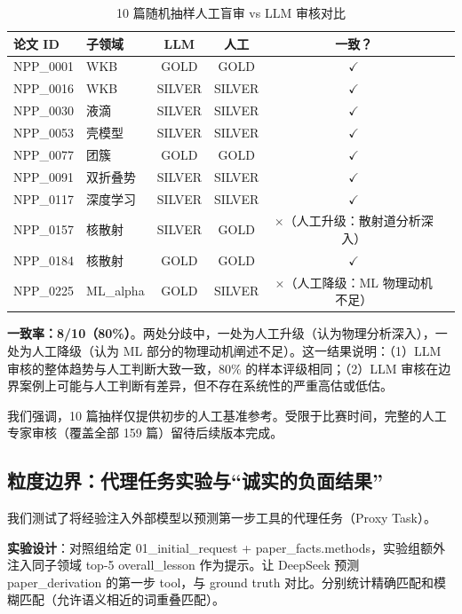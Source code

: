 \documentclass[12pt,a4paper]{article}
\begin{document}
\begin{table}[h]
\centering
\caption{10 篇随机抽样人工盲审 vs LLM 审核对比}
\label{tab:human}
\begin{tabular}{llcccc}
\toprule
\textbf{论文 ID} & \textbf{子领域} & \textbf{LLM} & \textbf{人工} & \textbf{一致？} \\
\midrule
NPP\_0001 & WKB & GOLD & GOLD & $\checkmark$ \\
NPP\_0016 & WKB & SILVER & SILVER & $\checkmark$ \\
NPP\_0030 & 液滴 & SILVER & SILVER & $\checkmark$ \\
NPP\_0053 & 壳模型 & SILVER & SILVER & $\checkmark$ \\
NPP\_0077 & 团簇 & GOLD & GOLD & $\checkmark$ \\
NPP\_0091 & 双折叠势 & SILVER & SILVER & $\checkmark$ \\
NPP\_0117 & 深度学习 & SILVER & SILVER & $\checkmark$ \\
NPP\_0157 & 核散射 & SILVER & GOLD & $\times$（人工升级：散射道分析深入）\\
NPP\_0184 & 核散射 & GOLD & GOLD & $\checkmark$ \\
NPP\_0225 & ML\_alpha & GOLD & SILVER & $\times$（人工降级：ML 物理动机不足）\\
\bottomrule
\end{tabular}
\end{table}

\textbf{一致率：8/10（80\%）}。两处分歧中，一处为人工升级（认为物理分析深入），一处为人工降级（认为 ML 部分的物理动机阐述不足）。这一结果说明：（1）LLM 审核的整体趋势与人工判断大致一致，80\% 的样本评级相同；（2）LLM 审核在边界案例上可能与人工判断有差异，但不存在系统性的严重高估或低估。

我们强调，10 篇抽样仅提供初步的人工基准参考。受限于比赛时间，完整的人工专家审核（覆盖全部 159 篇）留待后续版本完成。

\subsection{粒度边界：代理任务实验与“诚实的负面结果”}

我们测试了将经验注入外部模型以预测第一步工具的代理任务（Proxy Task）。

\textbf{实验设计}：对照组给定 01\_initial\_request + paper\_facts.methods，实验组额外注入同子领域 top-5 overall\_lesson 作为提示。让 DeepSeek 预测 paper\_derivation 的第一步 tool，与 ground truth 对比。分别统计精确匹配和模糊匹配（允许语义相近的词重叠匹配）。
\end{document}

